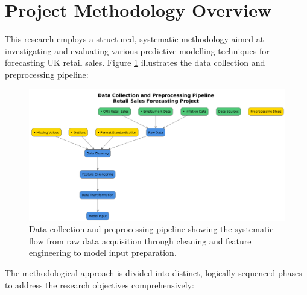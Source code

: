 \documentclass[12pt,a4paper]{report}
\begin{document}
\section{Project Methodology Overview}
This research employs a structured, systematic methodology aimed at investigating and evaluating various predictive modelling techniques for forecasting UK retail sales. Figure \ref{fig:data_pipeline} illustrates the data collection and preprocessing pipeline:

\begin{figure}[htbp]
    \centering
    \includegraphics[width=\textwidth]{data_pipeline}
    \caption{Data collection and preprocessing pipeline showing the systematic flow from raw data acquisition through cleaning and feature engineering to model input preparation.}
    \label{fig:data_pipeline}
\end{figure}

The methodological approach is divided into distinct, logically sequenced phases to address the research objectives comprehensively:
\end{document}
